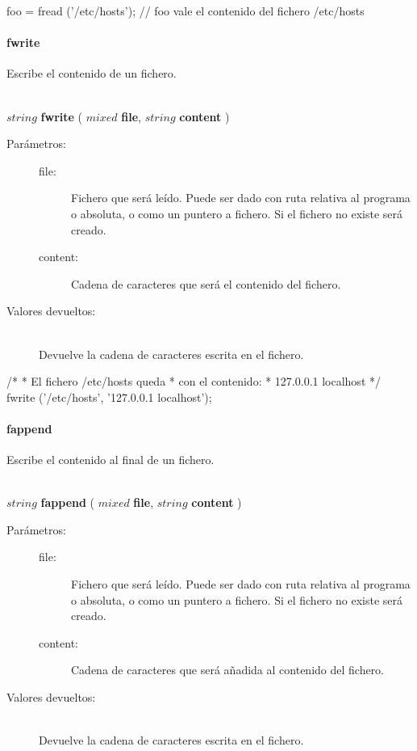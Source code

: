 \begin{myverbatim}  
   foo = fread ('/etc/hosts'); // foo vale el contenido del fichero /etc/hosts
\end{myverbatim}

\paragraph{fwrite}
Escribe el contenido de un fichero.

\begin{framed}
\hfill \\ $string$ \textbf{fwrite} ( $mixed$ \textbf{file}, $string$ \textbf{content}  )  
\begin{description}
\item [Parámetros:] \hfill 
   \begin{description}
   \item[file:] Fichero que será leído. Puede ser dado con ruta relativa al programa o absoluta, o como un puntero a fichero. 
   Si el fichero no existe será creado.
   \item[content:] Cadena de caracteres que será el contenido del fichero.
   \end{description}
\item[Valores devueltos:] \hfill \\
   Devuelve la cadena de caracteres escrita en el fichero.
\end{description}
\end{framed}

\begin{myverbatim}  
   /*
   * El fichero /etc/hosts queda
   * con el contenido:
   * 127.0.0.1 localhost
   */
   fwrite ('/etc/hosts', '127.0.0.1 localhost');
\end{myverbatim}

\paragraph{fappend}
Escribe el contenido al final de un fichero.

\begin{framed}
\hfill \\ $string$ \textbf{fappend} ( $mixed$ \textbf{file}, $string$ \textbf{content}  )  
\begin{description}
\item [Parámetros:] \hfill 
   \begin{description}
   \item[file:] Fichero que será leído. Puede ser dado con ruta relativa al programa o absoluta, o como un puntero a fichero. 
   Si el fichero no existe será creado.
   \item[content:] Cadena de caracteres que será añadida al contenido del fichero.
   \end{description}
\item[Valores devueltos:] \hfill \\
   Devuelve la cadena de caracteres escrita en el fichero.
\end{description}
\end{framed}

